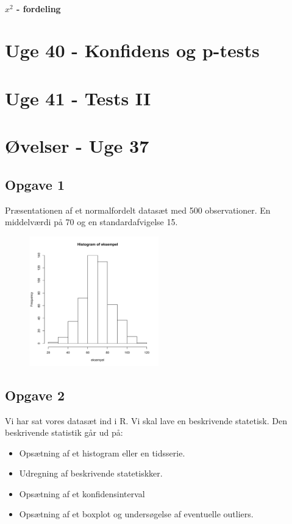 \documentclass{article}
\begin{document}
\paragraph{$x^2$  - fordeling}

\newpage

\section{Uge 40 - Konfidens og p-tests}

\section{Uge 41 - Tests II}



\section{Øvelser - Uge 37}
\subsection{Opgave 1}
Præsentationen af et normalfordelt datasæt med 500 observationer. En middelværdi
på 70 og en standardafvigelse 15.
\begin{figure}[H] 
  \centering
  \includegraphics[width=0.5\textwidth]{../velser/uge37/R/opg1.pdf}
\end{figure}

\subsection{Opgave 2}
Vi har sat vores datasæt ind i R. Vi skal lave en beskrivende statetisk. Den
beskrivende statistik går ud på:
\begin{itemize}
  \item Opsætning af et histogram eller en tidsserie.
  \item Udregning af beskrivende statetiskker.
  \item Opsætning af et konfidensinterval
  \item Opsætning af et boxplot og undersøgelse af eventuelle outliers.
\end{itemize}
\end{document}
